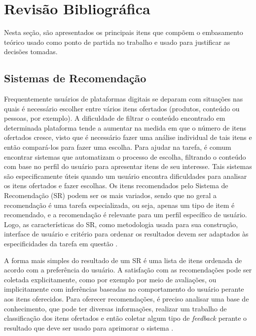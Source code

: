 \documentclass[12pt]{article}
\begin{document}
\section{Revisão Bibliográfica}

Nesta seção, são apresentados os principais itens que compõem o embasamento teórico usado como ponto de 
partida no trabalho e usado para justificar as decisões tomadas.

\subsection{Sistemas de Recomendação}

Frequentemente usuários de plataformas digitais se deparam com situações nas quais é necessário escolher entre 
vários itens ofertados (produtos, conteúdo ou pessoas, por exemplo). A dificuldade de filtrar o conteúdo encontrado em determinada 
plataforma tende a aumentar na medida em que o número de itens ofertados cresce, visto que é necessário fazer uma 
análise individual de tais itens e então compará-los para fazer uma escolha. Para ajudar na tarefa, é comum encontrar 
sistemas que automatizam o processo de escolha, filtrando o conteúdo com base no perfil do usuário para apresentar 
itens de seu interesse. Tais sistemas são especificamente úteis quando um usuário encontra dificuldades para analisar os itens 
ofertados e fazer escolhas. Os itens recomendados pelo Sistema de Recomendação (SR) podem ser os mais variados, sendo que no geral a recomendação é uma tarefa especializada, ou seja, apenas um tipo de item é recomendado, e a recomendação é relevante para um perfil 
específico de usuário. Logo, as características do SR, como metodologia usada para sua construção, interface de usuário 
e critério para ordenar os resultados devem ser adaptados às especificidades da tarefa em questão \cite{ricci2011introduction}. 

A forma mais simples do resultado de um SR é uma lista de itens ordenada de acordo com a preferência do usuário. A satisfação 
com as recomendações pode ser coletada explicitamente, como por exemplo por meio de avaliações, ou implicitamente com 
inferências baseadas no comportamento do usuário perante aos itens oferecidos. Para oferecer recomendações, é preciso analisar 
uma base de conhecimento, que pode ter diversas informações, realizar um trabalho de classificação dos itens ofertados e 
então coletar algum tipo de \textit{feedback} perante o resultado que deve ser usado para aprimorar o sistema \cite{shani2011evaluating}.
\end{document}
